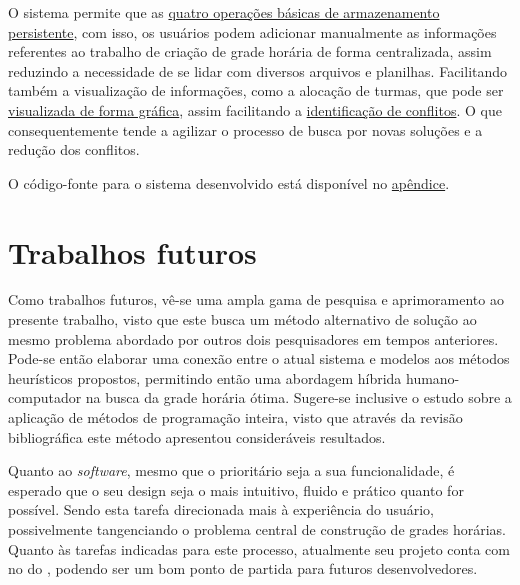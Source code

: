 O sistema permite que as \hyperref[sssec:Funcionalidades Iniciais]{quatro operações básicas de armazenamento persistente}, com isso, os usuários podem adicionar manualmente as informações referentes ao trabalho de criação de grade horária de forma centralizada, assim reduzindo a necessidade de se lidar com diversos arquivos e planilhas. Facilitando também a visualização de informações, como a alocação de turmas, que pode ser \hyperref[fig:pagina_multiFiltros]{visualizada de forma gráfica}, assim facilitando a \hyperref[sec:conflitos]{identificação de conflitos}. O que consequentemente tende a agilizar o processo de busca por novas soluções e a redução dos conflitos.

O código-fonte para o sistema desenvolvido está disponível no \hyperref[apendice:CodigoFonte]{apêndice}.

\section{Trabalhos futuros} %

Como trabalhos futuros, vê-se uma ampla gama de pesquisa e aprimoramento ao presente trabalho, visto que este busca um método alternativo de solução ao mesmo problema abordado por outros dois pesquisadores em tempos anteriores. Pode-se então elaborar uma conexão entre o atual sistema e modelos aos métodos heurísticos propostos, permitindo então uma abordagem híbrida humano-computador na busca da grade horária ótima. Sugere-se inclusive o estudo sobre a aplicação de métodos de programação inteira, visto que através da revisão bibliográfica este método apresentou consideráveis resultados.

Quanto ao \textit{software}, mesmo que o prioritário seja a sua funcionalidade, é esperado que o seu design seja o mais intuitivo, fluido e prático quanto for possível. Sendo esta tarefa direcionada mais à experiência do usuário, possivelmente tangenciando o problema central de construção de grades horárias. Quanto às tarefas indicadas para este processo, atualmente seu projeto conta com  no  do , podendo ser um bom ponto de partida para futuros desenvolvedores.


